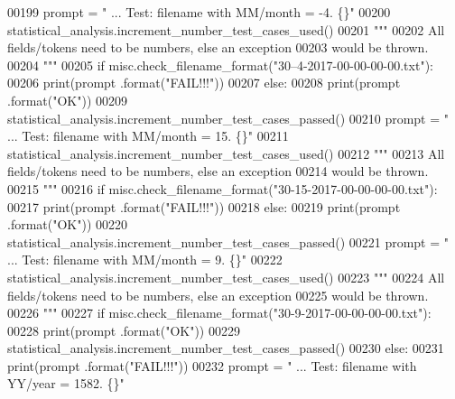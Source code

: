 \begin{DoxyCode}
00199         prompt = \textcolor{stringliteral}{"  ... Test: filename with MM/month = -4.          \{\}"}
00200         statistical\_analysis.increment\_number\_test\_cases\_used()
00201         \textcolor{stringliteral}{"""}
00202 \textcolor{stringliteral}{            All fields/tokens need to be numbers, else an exception}
00203 \textcolor{stringliteral}{                would be thrown.}
00204 \textcolor{stringliteral}{        """}
00205         \textcolor{keywordflow}{if} misc.check\_filename\_format(\textcolor{stringliteral}{"30--4-2017-00-00-00-00.txt"}):
00206             print(prompt .format(\textcolor{stringliteral}{"FAIL!!!"}))
00207         \textcolor{keywordflow}{else}:
00208             print(prompt .format(\textcolor{stringliteral}{"OK"}))
00209             statistical\_analysis.increment\_number\_test\_cases\_passed()
00210         prompt = \textcolor{stringliteral}{"  ... Test: filename with MM/month = 15.          \{\}"}
00211         statistical\_analysis.increment\_number\_test\_cases\_used()
00212         \textcolor{stringliteral}{"""}
00213 \textcolor{stringliteral}{            All fields/tokens need to be numbers, else an exception}
00214 \textcolor{stringliteral}{                would be thrown.}
00215 \textcolor{stringliteral}{        """}
00216         \textcolor{keywordflow}{if} misc.check\_filename\_format(\textcolor{stringliteral}{"30-15-2017-00-00-00-00.txt"}):
00217             print(prompt .format(\textcolor{stringliteral}{"FAIL!!!"}))
00218         \textcolor{keywordflow}{else}:
00219             print(prompt .format(\textcolor{stringliteral}{"OK"}))
00220             statistical\_analysis.increment\_number\_test\_cases\_passed()
00221         prompt = \textcolor{stringliteral}{"  ... Test: filename with MM/month = 9.           \{\}"}
00222         statistical\_analysis.increment\_number\_test\_cases\_used()
00223         \textcolor{stringliteral}{"""}
00224 \textcolor{stringliteral}{            All fields/tokens need to be numbers, else an exception}
00225 \textcolor{stringliteral}{                would be thrown.}
00226 \textcolor{stringliteral}{        """}
00227         \textcolor{keywordflow}{if} misc.check\_filename\_format(\textcolor{stringliteral}{"30-9-2017-00-00-00-00.txt"}):
00228             print(prompt .format(\textcolor{stringliteral}{"OK"}))
00229             statistical\_analysis.increment\_number\_test\_cases\_passed()
00230         \textcolor{keywordflow}{else}:
00231             print(prompt .format(\textcolor{stringliteral}{"FAIL!!!"}))
00232         prompt = \textcolor{stringliteral}{"  ... Test: filename with YY/year = 1582.         \{\}"}

\end{DoxyCode}
